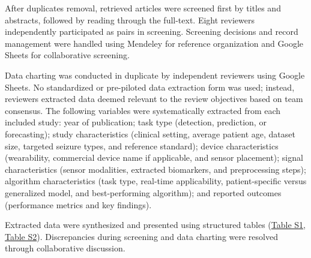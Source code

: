 After duplicates removal, retrieved articles were screened first by titles and abstracts, followed by reading through the full-text. Eight reviewers independently participated as pairs in screening. Screening decisions and record management were handled using Mendeley for reference organization and Google Sheets for collaborative screening. 

Data charting was conducted in duplicate by independent reviewers using Google Sheets. No standardized or pre-piloted data extraction form was used; instead, reviewers extracted data deemed relevant to the review objectives based on team consensus. The following variables were systematically extracted from each included study: year of publication; task type (detection, prediction, or forecasting); study characteristics (clinical setting,  average patient age, dataset size, targeted seizure types, and reference standard); device characteristics (wearability, commercial device name if applicable, and sensor placement); signal characteristics (sensor modalities, extracted biomarkers, and preprocessing steps); algorithm characteristics (task type, real-time applicability, patient-specific versus generalized model, and best-performing algorithm); and reported outcomes (performance metrics and key findings). 

Extracted data were synthesized and presented using structured tables (\href{https://docs.google.com/spreadsheets/d/1FjxwkHFbNDM84nuqg513gR_0vIVql-evoT1EMiqSYZU/edit?pli=1&gid=1255223968#gid=1255223968}{Table S1}, \href{https://docs.google.com/spreadsheets/d/1FjxwkHFbNDM84nuqg513gR_0vIVql-evoT1EMiqSYZU/edit?pli=1&gid=97270185#gid=97270185}{Table S2}).
Discrepancies during screening and data charting were resolved through collaborative discussion.
